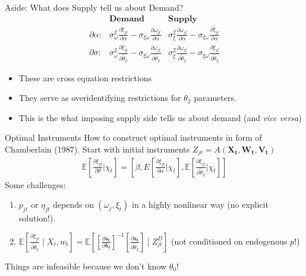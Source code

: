 \documentclass[xcolor=pdftex,dvipsnames,table,mathserif,aspectratio=169]{beamer}
\newcommand{\del}{\partial}
\begin{document}
\begin{frame}{Aside: What does Supply tell us about Demand?}
\begin{align*}
& \textbf{Demand} & \textbf{Supply} \\
\del \alpha:& 
        \sigma_\omega^2 \frac{\partial \xi_{jt}}{\partial \alpha} - 
        \sigma_{\xi\omega}\frac{\partial \omega_{jt}}{\partial \alpha} 
        & \sigma_{\xi}^2 \frac{\partial \omega_{jt}}{\partial \alpha}  - 
        \sigma_{\xi\omega}\frac{\partial \xi_{jt}}{\partial \alpha}  \\
\del \sigma:& 
        \sigma_\omega^2 \frac{\partial \xi_{jt}}{\partial \widetilde{\theta}_2}  -
        \sigma_{\xi\omega}\frac{\partial \omega_{jt}}{\partial \widetilde{\theta}_2} 
        & \sigma_{\xi}^2 \frac{\partial \omega_{jt}}{\partial \widetilde{\theta}_2} - 
        \sigma_{\xi\omega}\frac{\partial \xi_{jt}}{\partial \widetilde{\theta}_2}
\end{align*}
\begin{itemize}
\item These are \alert{cross equation restrictions}
\item They serve as \alert{overidentifying restrictions} for $\theta_2$ parameters.
\item This is the what imposing supply side tells us about demand (and \textit{vice versa})
\end{itemize}
\end{frame}


\begin{frame}{Optimal Instruments}
How to construct optimal instruments in form of Chamberlain (1987). Start with initial instruments $Z_{jt}=A\left(\mathbf{X_t},\mathbf{W_t},\mathbf{V_t}\right)$
\begin{eqnarray*}
\mathbb{E}\left[\frac{\partial \xi_{jt}}{\partial \theta} | \chi_{t} \right] = \left[\beta, E\left[\frac{\partial \xi_{jt}}{\partial \alpha} | \chi_{t} \right] ,
 \mathbb{E}\left[\frac{\partial \xi_{jt}}{\partial \widetilde{\theta}_2} | \chi_{t} \right] \right]
\end{eqnarray*}
Some challenges:
\begin{enumerate}
\item $p_{jt}$ or $\eta_{jt}$ depends on $(\omega_{j},\xi_{t})$ in a highly nonlinear way (no explicit solution!).
\item $\mathbb{E}\left[\frac{\partial \xi_{jt}}{\partial \widetilde{\theta}_2} \mid X_t, w_{t} \right] =\mathbb{E}\left[\left[\frac{\partial \mathbf{s_t}}{\partial \mathbf{\delta_t}}\right]^{-1} 
\left[\frac{\partial \mathbf{s_t}}{\partial \widetilde{\theta}_2}\right] \mid Z_{jt}^D \right]$  (not conditioned on endogenous $p$!)
\end{enumerate}
Things are \alert{infeasible} because we don't know $\theta_0$!
\end{frame}
\end{document}
